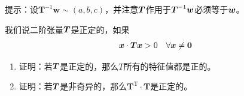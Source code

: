 \begin{exercise}
\begin{enumerate}
        提示：设$\boldsymbol{T}^{-1}\boldsymbol{w}\sim \left( a,b,c \right) $，并注意$\bb{T}$作用于$\bb{T}^{-1}\bb{w}$必须等于$\bb{w}$。
    \end{enumerate}
    \item 我们说二阶张量$\bb{T}$是正定的，如果
    \begin{equation*}
        \begin{matrix}
            \boldsymbol{x}\cdot \boldsymbol{Tx}>0&		\forall \boldsymbol{x}\ne \bf{0}
        \end{matrix}
    \end{equation*}
    \begin{enumerate}
        \item 证明：若$\bb{T}$是正定的，那么$T$所有的特征值都是正的。
        \item 证明：若$\bb{T}$是非奇异的，那么$\boldsymbol{T}^{\mathrm{T}}\cdot \boldsymbol{T}$是正定的。
    \end{enumerate}
\end{exercise}
